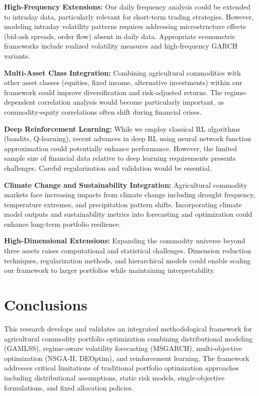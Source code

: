 \documentclass[
  10pt,
  a4paper,
]{article}
\begin{document}
\begin{tcolorbox}
\textbf{High-Frequency Extensions:} Our daily frequency analysis could
be extended to intraday data, particularly relevant for short-term
trading strategies. However, modeling intraday volatility patterns
requires addressing microstructure effects (bid-ask spreads, order flow)
absent in daily data. Appropriate econometric frameworks include
realized volatility measures and high-frequency GARCH variants.

\textbf{Multi-Asset Class Integration:} Combining agricultural
commodities with other asset classes (equities, fixed income,
alternative investments) within our framework could improve
diversification and risk-adjusted returns. The regime-dependent
correlation analysis would become particularly important, as
commodity-equity correlations often shift during financial crises.

\textbf{Deep Reinforcement Learning:} While we employ classical RL
algorithms (bandits, Q-learning), recent advances in deep RL using
neural network function approximation could potentially enhance
performance. However, the limited sample size of financial data relative
to deep learning requirements presents challenges. Careful
regularization and validation would be essential.

\textbf{Climate Change and Sustainability Integration:} Agricultural
commodity markets face increasing impacts from climate change including
drought frequency, temperature extremes, and precipitation pattern
shifts. Incorporating climate model outputs and sustainability metrics
into forecasting and optimization could enhance long-term portfolio
resilience.

\textbf{High-Dimensional Extensions:} Expanding the commodity universe
beyond three assets raises computational and statistical challenges.
Dimension reduction techniques, regularization methods, and hierarchical
models could enable scaling our framework to larger portfolios while
maintaining interpretability.

\section{Conclusions}\label{sec-conclusions}

This research develops and validates an integrated methodological
framework for agricultural commodity portfolio optimization combining
distributional modeling (GAMLSS), regime-aware volatility forecasting
(MSGARCH), multi-objective optimization (NSGA-II, DEOptim), and
reinforcement learning. The framework addresses critical limitations of
traditional portfolio optimization approaches including distributional
assumptions, static risk models, single-objective formulations, and
fixed allocation policies.


\end{tcolorbox}
\end{document}
